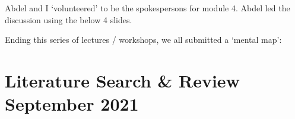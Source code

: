 \documentclass[letterpaper,10pt,english]{jupyterBook}
\begin{document}
\sphinxAtStartPar
Abdel and I ‘volunteered’ to be the spokespersons for module 4. Abdel led the discussion using the below 4 slides.

\begin{figure}[htbp]
\centering

\noindent{}
\end{figure}

\begin{figure}[htbp]
\centering

\noindent{}
\end{figure}

\begin{figure}[htbp]
\centering

\noindent{}
\end{figure}

\begin{figure}[htbp]
\centering

\noindent{}
\end{figure}

\sphinxAtStartPar
Ending this series of lectures / workshops, we all submitted a ‘mental map’:

\begin{figure}[htbp]
\centering

\noindent{}
\end{figure}


\chapter{Literature Search \& Review September 2021}
\label{\detokenize{docs/module2:literature-search-review-september-2021}}\label{\detokenize{docs/module2::doc}}
\begin{figure}[htbp]
\centering

\noindent{}
\end{figure}

\begin{figure}[htbp]
\centering

\noindent{}
\end{figure}

\begin{figure}[htbp]
\centering

\noindent{}
\end{figure}
\end{document}

